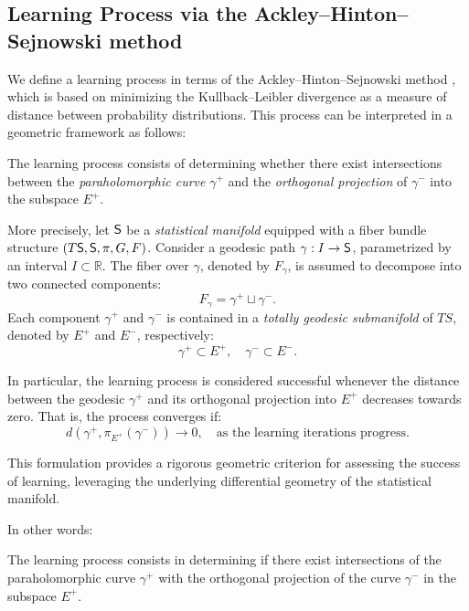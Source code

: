 \subsection{Learning Process via the Ackley--Hinton--Sejnowski method}

We define a learning process in terms of the Ackley--Hinton--Sejnowski method \cite{AHS}, which is based on minimizing the Kullback--Leibler divergence as a measure of distance between probability distributions. This process can be interpreted in a geometric framework as follows:

\begin{proposition} \label{P:CoNen}
The learning process consists of determining whether there exist intersections between the \emph{paraholomorphic curve} $\gamma^+ $ and the \emph{orthogonal projection} of $\gamma^- $ into the subspace $E^+ $.
\end{proposition}

More precisely, let $\mathsf{S}$ be a \emph{statistical manifold} equipped with a fiber bundle structure $(T\mathsf{S}, \mathsf{S}, \pi, G, F) $. Consider a geodesic path $\gamma: I \to \mathsf{S} $, parametrized by an interval $I \subset \mathbb{R}$. The fiber over $\gamma$, denoted by $F_{\gamma}$, is assumed to decompose into two connected components:
\[
    F_{\gamma} = \gamma^+ \sqcup \gamma^-.
\]
Each component $\gamma^+ $ and $\gamma^- $ is contained in a \emph{totally geodesic submanifold} of $TS $, denoted by $E^+ $ and $E^- $, respectively:
\[
    \gamma^+ \subset E^+, \quad \gamma^- \subset E^-.
\]

In particular, the learning process is considered successful whenever the distance between the geodesic $\gamma^+ $ and its orthogonal projection into $E^+ $ decreases towards zero. That is, the process converges if:
\[
    d(\gamma^+, \pi_{E^+}(\gamma^-)) \to 0, \quad \text{as the learning iterations progress}.
\]

This formulation provides a rigorous geometric criterion for assessing the success of learning, leveraging the underlying differential geometry of the statistical manifold.

In other words: 
\begin{proposition}\label{P:CoNen}
The learning process consists in determining if there exist intersections of the paraholomorphic curve $\gamma^+$ with the orthogonal projection of the curve $\gamma^-$ in the subspace $E^+$. 
\end{proposition} 

